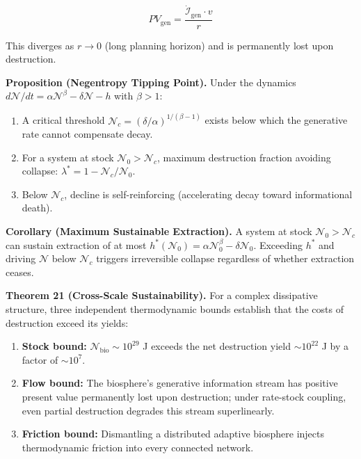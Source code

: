 \documentclass[11pt]{article}
\begin{document}
\[PV_{\text{gen}} = \frac{\dot{\mathcal{I}}_{\text{gen}} \cdot v}{r}\]

This diverges as \(r \to 0\) (long planning horizon) and is permanently
lost upon destruction.

\textbf{Proposition (Negentropy Tipping Point).} Under the dynamics
\(d\mathcal{N}/dt = \alpha\mathcal{N}^\beta - \delta\mathcal{N} - h\)
with \(\beta > 1\):

\begin{enumerate}
\def\labelenumi{(\alph{enumi})}
\item
  A critical threshold \(\mathcal{N}_c = (\delta/\alpha)^{1/(\beta-1)}\)
  exists below which the generative rate cannot compensate decay.
\item
  For a system at stock \(\mathcal{N}_0 > \mathcal{N}_c\), maximum
  destruction fraction avoiding collapse:
  \(\lambda^* = 1 - \mathcal{N}_c / \mathcal{N}_0\).
\item
  Below \(\mathcal{N}_c\), decline is self-reinforcing (accelerating
  decay toward informational death).
\end{enumerate}

\textbf{Corollary (Maximum Sustainable Extraction).} A system at stock
\(\mathcal{N}_0 > \mathcal{N}_c\) can sustain extraction of at most
\(h^*(\mathcal{N}_0) = \alpha\mathcal{N}_0^\beta - \delta\mathcal{N}_0\).
Exceeding \(h^*\) and driving \(\mathcal{N}\) below \(\mathcal{N}_c\)
triggers irreversible collapse regardless of whether extraction ceases.

\textbf{Theorem 21 (Cross-Scale Sustainability).} For a complex
dissipative structure, three independent thermodynamic bounds establish
that the costs of destruction exceed its yields:

\begin{enumerate}
\def\labelenumi{(\roman{enumi})}
\item
  \textbf{Stock bound:} \(\mathcal{N}_{\text{bio}} \sim 10^{29}\) J
  exceeds the net destruction yield \(\sim 10^{22}\) J by a factor of
  \(\sim 10^7\).
\item
  \textbf{Flow bound:} The biosphere's generative information stream has
  positive present value permanently lost upon destruction; under
  rate-stock coupling, even partial destruction degrades this stream
  superlinearly.
\item
  \textbf{Friction bound:} Dismantling a distributed adaptive biosphere
  injects thermodynamic friction into every connected network.
\end{enumerate}
\end{document}
